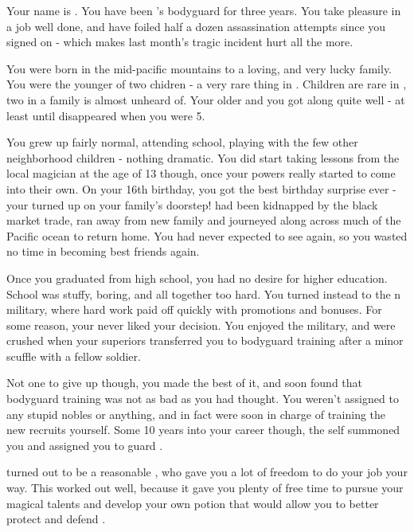 \documentclass[char]{NeptuneBall}
\begin{document}
\name{\cBodyguard{}}

Your name is \cBodyguard{}. You have been \cPrince{}'s bodyguard for three years. You take pleasure in a job well done, and have foiled half a dozen assassination attempts since you signed on - which makes last month's tragic incident hurt all the more.

You were born in the mid-pacific mountains to a loving, and very lucky family. You were the younger of two chidren - a very rare thing in \pPacifica{}. Children are rare in \pPacifica{}, two in a family is almost unheard of. Your older \cSpy{\sibling} \cSpy{} and you got along quite well - at least until \cSpy{\they} disappeared when you were 5.

You grew up fairly normal, attending school, playing with the few other neighborhood children - nothing dramatic. You did start taking lessons from the local magician at the age of 13 though, once your powers really started to come into their own. On your 16th birthday, you got the best birthday surprise ever - your \cSpy{\sibling} turned up on your family's doorstep! \cSpy{\They} had been kidnapped by the black market trade, ran away from \cSpy{\their} new family and journeyed along across much of the Pacific ocean to return home. You had never expected to see \cSpy{\them} again, so you wasted no time in becoming best friends again.

Once you graduated from high school, you had no desire for higher education. School was stuffy, boring, and all together too hard. You turned instead to the \pPacifica{}n military, where hard work paid off quickly with promotions and bonuses. For some reason, your \cSpy{\sibling} never liked your decision. You enjoyed the military, and were crushed when your superiors transferred you to bodyguard training after a minor scuffle with a fellow soldier.

Not one to give up though, you made the best of it, and soon found that bodyguard training was not as bad as you had thought. You weren't assigned to any stupid nobles or anything, and in fact were soon in charge of training the new recruits yourself. Some 10 years into your career though, the \cPacificanRuler{\King} \cPacificanRuler{\them}self summoned you and assigned you to guard \cPacificanRuler{\them} \cPrince{\offspring} \cPrince{}.

\cPrince{} turned out to be a reasonable \cPrince{\guy}, who gave you a lot of freedom to do your job your way. This worked out well, because it gave you plenty of free time to pursue your magical talents and develop your own potion that would allow you to better protect and defend \cPrince{\them}.
\end{document}
